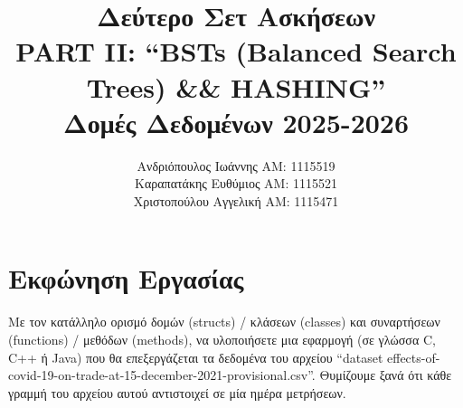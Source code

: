 \documentclass[a4paper,12pt]{article}
\title{Δεύτερο Σετ Ασκήσεων\\PART II: “BSTs (Balanced Search Trees) \&\& HASHING” \\ Δομές Δεδομένων 2025-2026}
\author{
	Ανδριόπουλος Ιωάννης ΑΜ: 1115519\\
	Καραπατάκης Ευθύμιος ΑΜ: 1115521\\
	Χριστοπούλου Αγγελική ΑΜ: 1115471
}
\begin{document}
	
	\maketitle
	\newpage
	\tableofcontents
	\newpage
	
	\section{Εκφώνηση Εργασίας}
	
	Με τον κατάλληλο ορισμό δομών (structs) / κλάσεων (classes) και συναρτήσεων (functions) / μεθόδων
	(methods), να υλοποιήσετε μια εφαρμογή (σε γλώσσα C, C++ ή Java) που θα επεξεργάζεται τα
	δεδομένα του αρχείου “dataset effects-of-covid-19-on-trade-at-15-december-2021-provisional.csv”.
	Θυμίζουμε ξανά ότι κάθε γραμμή του αρχείου αυτού αντιστοιχεί σε μία ημέρα μετρήσεων.
	
\end{document}
